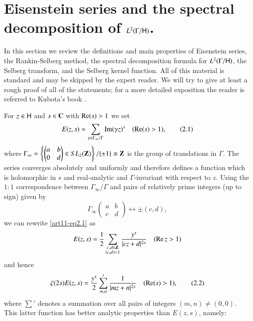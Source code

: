 \section[Eisenstein series and the spectral decomposition...]{Eisenstein series and the spectral decomposition of $L^2 (\Gamma / \mathsf{H})$.}\label{art11-sec2}\pageoriginale
In this section we review the definitions and main properties of Eisenstein series, the Rankin-Selberg method, the spectral decomposition formula for $L^2 (\Gamma / \mathsf{H})$, the Selberg transform, and the Selberg kernel function. All of this material is standard and may be skipped by the expert reader. We will try to give at least a rough proof of all of the statements; for a more detailed exposition the reader is referred to Kubota's book \cite{art11-4}.

\medskip
\noindent
{}
For $z \in \mathsf{H}$ and $s \in \mathbf{C}$ with $\operatorname{Re} (s) >1$ we set
\begin{equation*}
E(z,s ) = \sum\limits_{ \gamma \in \Gamma_\infty/ \Gamma} \operatorname{Im} (\gamma z)^s \quad (\operatorname{Re} (s) >1), \tag{2.1}\label{art11-eq2.1}
\end{equation*}
where $\Gamma_\infty = \left\{ \left(\begin{matrix}
a & b \\
0 &d
\end{matrix}
\right) \in SL_2(\mathbf{Z}) \right\} / \{\pm 1\} \cong\mathbf{Z}$ is the group of translations in $\Gamma$. The series converges absolutely and uniformly and therefore defines a function which is holomorphic in $s$ and real-analytic and $\Gamma$-invariant with respect to $z$. Using the $1:1$ correspondence between $\Gamma_\infty/ \Gamma$ and pairs of relatively prime integers (up to sign) given by 
$$
\Gamma_\infty \left(\begin{matrix}
a & b \\ c & d
\end{matrix}\right) \longleftrightarrow \pm (c,d),
$$ 
we can rewrite \eqref{art11-eq2.1} as 
$$
E(z, s) = \frac{1}{2} \sum\limits_{\substack{c , d \in \mathbf{Z}\\ (c,d) =1}} \frac{y^s}{|cz+d|^{2s}} \quad (\operatorname{Re} z > 1)
$$
and hence 
\begin{equation*}
\zeta(2s) E (z,s) =\frac{y^s}{2} \sum\limits'_{m,n} \frac{1}{|mz+n|^{2s}} \quad  (\operatorname{Re} (s) >1), \tag{2.2}\label{art11-eq2.2}
\end{equation*}
where $\sum'$ denotes a summation over all pairs of integers $(m,n) \neq (0,0)$. This latter function has better analytic properties than $E(z,s)$, namely:

